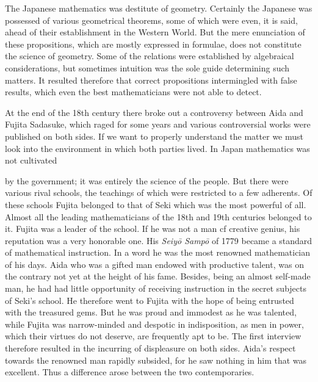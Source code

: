 \documentclass[11pt]{article}
\newcommand{\scanpage}[2]{\clearpage\setcounter{footnote}{0}\noindent{\footnotesize\color{gray}PDF page #1 · #2}\par\medskip}
\newcommand{\scanfooter}{}
\begin{document}
The Japanese mathematics was destitute of geometry. Certainly the Japanese was possessed of various geometrical theorems, some of which were even, it is said, ahead of their establishment in the Western World. But the mere enunciation of these propositions, which are mostly expressed in formulae, does not constitute the science of geometry. Some of the relations were established by algebraical considerations, but sometimes intuition was the sole guide determining such matters. It resulted therefore that correct propositions intermingled with false results, which even the best mathematicians were not able to detect.

At the end of the 18th century there broke out a controversy between Aida and Fujita Sadasuke, which raged for some years and various controversial works were published on both sides. If we want to properly understand the matter we must look into the environment in which both parties lived. In Japan mathematics was not cultivated
\scanfooter

\scanpage{0183}{Chapter 22, printed page 169}
by the government; it was entirely the science of the people. But there were various rival schools, the teachings of which were restricted to a few adherents. Of these schools Fujita belonged to that of Seki which was the most powerful of all. Almost all the leading mathematicians of the 18th and 19th centuries belonged to it. Fujita was a leader of the school. If he was not a man cf creative genius, his reputation was a very honorable one. His \emph{Seiyō Sampō} of 1779 became a standard of mathematical instruction. In a word he was the most renowned mathematician of his days. Aida who was a gifted man endowed with productive talent, was on the contrary not yet at the height of his fame. Besides, being an almost self-made man, he had had little opportunity of receiving instruction in the secret subjects of Seki's school. He therefore went to Fujita with the hope of being entrusted with the treasured gems. But he was proud and immodest as he was talented, while Fujita was narrow-minded and despotic in indisposition, as men in power, which their virtues do not deserve, are frequently apt to be. The first interview therefore resulted in the incurring of displeasure on both sides. Aida's respect towards the renowned man rapidly subsided, for he saw nothing in him that was excellent. Thus a difference arose between the two contemporaries.
\end{document}
